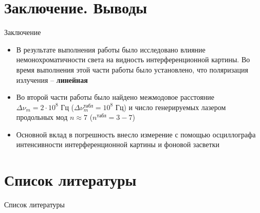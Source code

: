 \documentclass[11pt]{beamer} %
\begin{document}
\section{Заключение. Выводы}
    \begin{frame}{Заключение}
        \begin{itemize}
            \item В результате выполнения работы было исследовано влияние немонохроматичности света на видность интерференционной картины. Во время выполнения этой части работы было установлено, что поляризация излучения -- \textbf{линейная}
            \item Во второй части работы было найдено межмодовое расстояние $\Delta \nu_m = 2 \cdot 10^{8} \text{ Гц}$ ($\Delta \nu_{m}^{\text{табл}} = 10^{8} \text{ Гц}$) и число генерируемых лазером продольных мод $n \approx 7$ ($n^{\text{табл}} = 3-7$)
            \item Основной вклад в погрешность внесло измерение с помощью осциллографа интенсивности интерференционной картины и фоновой засветки
        \end{itemize}
    \end{frame}

    \section{Список литературы}
    \begin{frame}{Список литературы}
        \printbibliography
    \end{frame}
    
\end{document}
